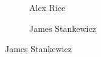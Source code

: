 \begin{frame}[plain]
\begin{figure}[h]
\begin{subfigure}{0.23\textwidth}
	\caption{Alex Rice}
	\end{subfigure}
	\begin{subfigure}{0.25\textwidth}
	\captionsetup{labelformat=empty}
	\centering
	\caption{James Stankewicz}
	\end{subfigure}
	\end{figure}
\end{frame}




